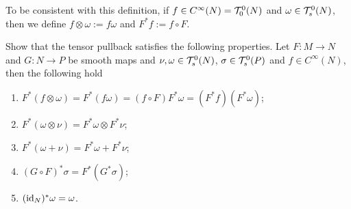To be consistent with this definition, if $f\in C^\infty(N) = \mathcal{T}_0^0(N)$ and $\omega \in\mathcal{T}_s^0(N)$, then we define $f\otimes \omega := f\omega$ and $F^* f := f\circ F$.

\begin{exercise}
	Show that the tensor pullback satisfies the following properties.
	Let $F:M\to N$ and $G:N\to P$ be smooth maps and $\nu, \omega \in\mathcal{T}_s^0(N)$, $\sigma \in\mathcal{T}_s^0(P)$ and $f\in C^\infty(N)$, then the following hold
	\begin{enumerate}
		\item $F^*(f\otimes\omega) = F^*(f \omega) = (f\circ F) F^*\omega = (F^* f)(F^*\omega)$;
		\item $F^*(\omega\otimes\nu) = F^*\omega\otimes F^*\nu$;
		\item $F^*(\omega + \nu) = F^*\omega + F^*\nu$;
		\item $(G\circ F)^*\sigma = F^*(G^* \sigma)$;
		\item $(\operatorname{id}_N)^* \omega = \omega$.
	\end{enumerate}
\end{exercise}

